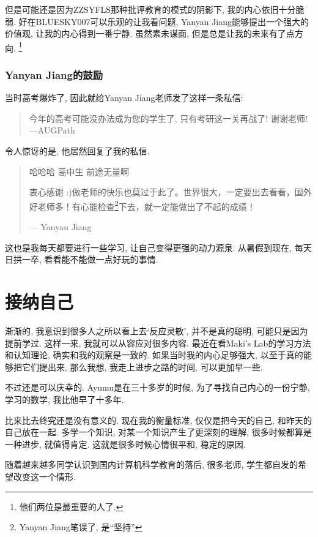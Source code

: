     但是可能还是因为ZZSYFLS那种批评教育的模式的阴影下, 我的内心依旧十分脆弱. 好在BLUESKY007可以乐观的让我看问题, Yanyan Jiang能够提出一个强大的价值观, 让我的内心得到一番宁静. 虽然素未谋面, 但是总是让我的未来有了点方向. \footnote{他们两位是最重要的人了.}
    
    \subsubsection{Yanyan Jiang的鼓励}

    当时高考爆炸了, 因此就给Yanyan Jiang老师发了这样一条私信:
    \begin{quote}
        今年的高考可能没办法成为您的学生了, 只有考研这一关再战了! 谢谢老师! \hfill ---AUGPath
    \end{quote}

    令人惊讶的是, 他居然回复了我的私信. 

    \begin{quote}
        哈哈哈 高中生 前途无量啊 
        
        衷心感谢 :)做老师的快乐也莫过于此了。世界很大，一定要出去看看，国外好老师多！有心能检查\footnote{Yanyan Jiang笔误了, 是``坚持''}下去，就一定能做出了不起的成绩！

        \hfill --- Yanyan Jiang
    \end{quote}

    这也是我每天都要进行一些学习, 让自己变得更强的动力源泉. 从暑假到现在, 每天日拱一卒, 看看能不能做一点好玩的事情. 

    \section{接纳自己}

    渐渐的, 我意识到很多人之所以看上去`反应灵敏', 并不是真的聪明, 可能只是因为提前学过. 这样一来, 我就可以从容应对很多内容. 最近在看Maki's Lab的学习方法和认知理论, 确实和我的观察是一致的. 如果当时我的内心足够强大, 以至于真的能够把它们提出来, 那么我想, 我走上进步之路的时间, 可以更加早一些.

    不过还是可以庆幸的. Ayumu是在三十多岁的时候, 为了寻找自己内心的一份宁静, 学习的数学, 我比他早了十多年. 

    比来比去终究还是没有意义的. 现在我的衡量标准, 仅仅是把今天的自己, 和昨天的自己放在一起. 多学一个知识, 对某一个知识产生了更深刻的理解, 很多时候都算是一种进步, 就值得肯定. 这就是很多时候心情很平和, 稳定的原因.

    随着越来越多同学认识到国内计算机科学教育的落后, 很多老师, 学生都自发的希望改变这一个情形. 

